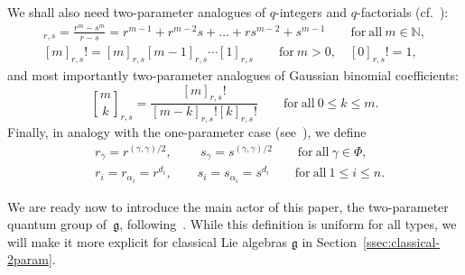 \documentclass[pdftex]{sigma}
\numberwithin{equation}{section}
\newcommand{\qbinom}{\genfrac{[}{]}{0pt}{}}
\newcommand{\fg}{\mathfrak{g}}
\newcommand{\BN}{\mathbb{N}}
\begin{document}
We shall also need two-parameter analogues of $q$-integers and $q$-factorials (cf.\ \cite[equation~(2.2)]{BW2}):
\begin{gather*}%
 [m]_{r,s} = \frac{r^{m} - s^{m}}{r - s} = r^{m-1} + r^{m-2}s + \dots + rs^{m-2} + s^{m-1}
 \qquad \mathrm{for\ all} \ m\in \BN,
\\ %
 [m]_{r,s}! = [m]_{r,s}[m-1]_{r,s} \cdots [1]_{r,s} \qquad \mathrm{for} \ m > 0,
 \quad [0]_{r,s}!=1,
\end{gather*}
and most importantly two-parameter analogues of Gaussian binomial coefficients:
\begin{displaymath}
 \qbinom{m}{k}_{r,s} = \frac{[m]_{r,s}!}{[m - k]_{r,s}![k]_{r,s}!}
 \qquad \mathrm{for\ all} \ 0\leq k\leq m.
\end{displaymath}
Finally, in analogy with the one-parameter case (see~\cite[Section~4.2]{J}), we define
\begin{align}
 & r_{\gamma} = r^{(\gamma,\gamma)/2},\ \qquad s_{\gamma} = s^{(\gamma,\gamma)/2}
 \qquad \mathrm{for\ all} \ \gamma\in \Phi, \nonumber\\
 & r_{i} = r_{\alpha_i} = r^{d_{i}},\qquad s_{i} = s_{\alpha_i} = s^{d_{i}}
 \qquad \mathrm{for\ all} \ 1\leq i\leq n.\label{eq:rs_i}
\end{align}

We are ready now to introduce the main actor of this paper, the two-parameter quantum group of~$\fg$, following~\cite{HP}. While this definition is uniform for all types, we will make it more explicit for classical Lie algebras $\fg$ in Section~\ref{ssec:classical-2param}.
\end{document}
